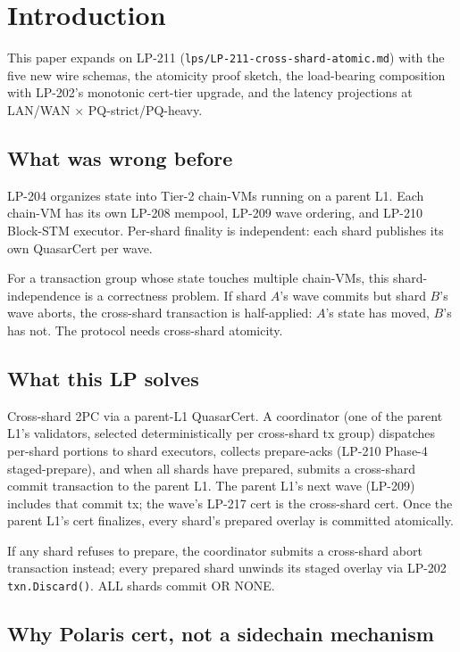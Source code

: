 \section{Introduction}

This paper expands on LP-211
(\texttt{lps/LP-211-cross-shard-atomic.md}) with the five new wire
schemas, the atomicity proof sketch, the load-bearing composition
with LP-202's monotonic cert-tier upgrade, and the latency
projections at LAN/WAN $\times$ PQ-strict/PQ-heavy.

\subsection{What was wrong before}

LP-204 organizes state into Tier-2 chain-VMs running on a parent L1.
Each chain-VM has its own LP-208 mempool, LP-209 wave ordering, and
LP-210 Block-STM executor. Per-shard finality is independent: each
shard publishes its own QuasarCert per wave.

For a transaction group whose state touches multiple chain-VMs, this
shard-independence is a correctness problem. If shard $A$'s wave
commits but shard $B$'s wave aborts, the cross-shard transaction is
half-applied: $A$'s state has moved, $B$'s has not. The protocol
needs cross-shard atomicity.

\subsection{What this LP solves}

Cross-shard 2PC via a parent-L1 QuasarCert. A coordinator (one of
the parent L1's validators, selected deterministically per cross-shard
tx group) dispatches per-shard portions to shard executors, collects
prepare-acks (LP-210 Phase-4 staged-prepare), and when all shards
have prepared, submits a cross-shard commit transaction to the
parent L1. The parent L1's next wave (LP-209) includes that commit
tx; the wave's LP-217 cert is the cross-shard cert. Once the parent
L1's cert finalizes, every shard's prepared overlay is committed
atomically.

If any shard refuses to prepare, the coordinator submits a
cross-shard abort transaction instead; every prepared shard unwinds
its staged overlay via LP-202 \texttt{txn.Discard()}. ALL shards
commit OR NONE.

\subsection{Why Polaris cert, not a sidechain mechanism}

